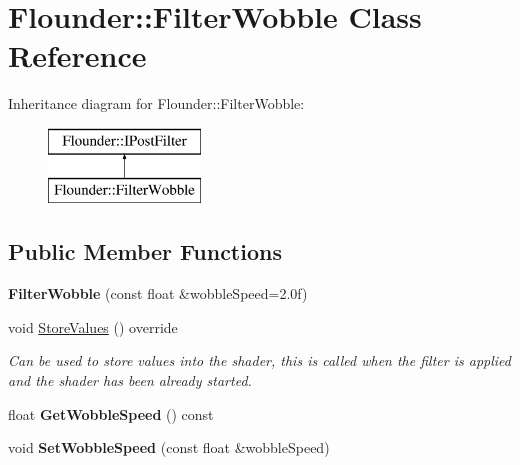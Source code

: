 \hypertarget{class_flounder_1_1_filter_wobble}{}\section{Flounder\+:\+:Filter\+Wobble Class Reference}
\label{class_flounder_1_1_filter_wobble}
Inheritance diagram for Flounder\+:\+:Filter\+Wobble\+:\begin{figure}[H]
\begin{center}
\leavevmode
\includegraphics[height=2.000000cm]{class_flounder_1_1_filter_wobble}
\end{center}
\end{figure}
\subsection*{Public Member Functions}
\begin{DoxyCompactItemize}
\item 
\mbox{\label{class_flounder_1_1_filter_wobble_a35175572b8b7bb739f7aa5ee148c107a}} 
{\bfseries Filter\+Wobble} (const float \&wobble\+Speed=2.\+0f)
\item 
void \hyperlink{class_flounder_1_1_filter_wobble_a678972a9832e8c750b7bd09979f342fa}{Store\+Values} () override
\begin{DoxyCompactList}\small\item\em Can be used to store values into the shader, this is called when the filter is applied and the shader has been already started. \end{DoxyCompactList}\item 
\mbox{\label{class_flounder_1_1_filter_wobble_a287e0d0539d6deca139fd7bf4d47bcea}} 
float {\bfseries Get\+Wobble\+Speed} () const
\item 
\mbox{\label{class_flounder_1_1_filter_wobble_a17793017705fbce674c21fb100fef0a4}} 
void {\bfseries Set\+Wobble\+Speed} (const float \&wobble\+Speed)
\end{DoxyCompactItemize}

